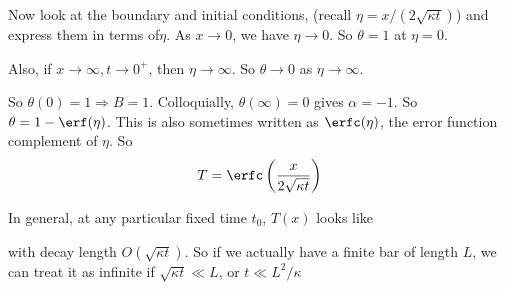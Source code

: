 \documentclass[a4paper]{article}
\begin{document}
\begin{eg}
      Now look at the boundary and initial conditions, (recall $\eta = x/(2\sqrt{\kappa t})$) and express them in terms of$\eta$. As $x \to 0$, we have $\eta \to 0$. So $\theta = 1$ at $\eta = 0$.

      Also, if $x\to \infty, t\to 0^+$, then $\eta \to \infty$. So $\theta \to 0$ as $\eta \to \infty$.

      So $\theta(0) = 1 \Rightarrow B = 1$. Colloquially, $\theta(\infty) = 0$ gives $\alpha = -1$. So $\theta = 1 - \erf(\eta)$. This is also sometimes written as $\erfc(\eta)$, the error function complement of $\eta$. So
      \[
        T = \erfc\left(\frac{x}{2\sqrt{\kappa t}}\right)
      \]

      In general, at any particular fixed time $t_0$, $T(x)$ looks like


      with decay length $O(\sqrt{\kappa t})$. So if we actually have a finite bar of length $L$, we can treat it as infinite if $\sqrt{\kappa t} \ll L$, or $t\ll L^2/\kappa$
    \end{eg}
    
\end{document}
